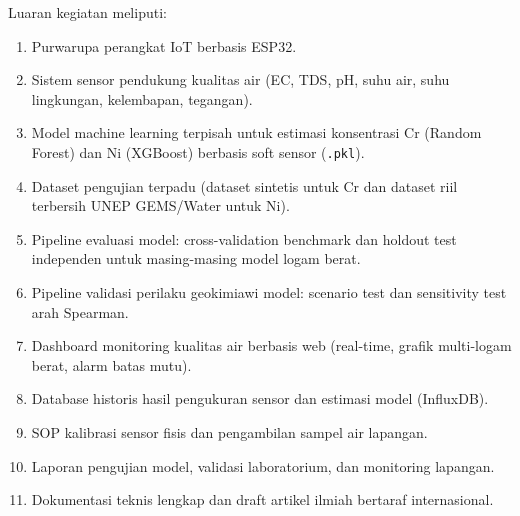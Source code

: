 \documentclass[12pt,a4paper]{article}
\begin{document}
Luaran kegiatan meliputi:

\begin{enumerate}
    \item Purwarupa perangkat IoT berbasis ESP32.
    \item Sistem sensor pendukung kualitas air (EC, TDS, pH, suhu air, suhu lingkungan, kelembapan, tegangan).
    \item Model machine learning terpisah untuk estimasi konsentrasi Cr (Random Forest) dan Ni (XGBoost) berbasis soft sensor (\texttt{.pkl}).
    \item Dataset pengujian terpadu (dataset sintetis untuk Cr dan dataset riil terbersih UNEP GEMS/Water untuk Ni).
    \item Pipeline evaluasi model: cross-validation benchmark dan holdout test independen untuk masing-masing model logam berat.
    \item Pipeline validasi perilaku geokimiawi model: scenario test dan sensitivity test arah Spearman.
    \item Dashboard monitoring kualitas air berbasis web (real-time, grafik multi-logam berat, alarm batas mutu).
    \item Database historis hasil pengukuran sensor dan estimasi model (InfluxDB).
    \item SOP kalibrasi sensor fisis dan pengambilan sampel air lapangan.
    \item Laporan pengujian model, validasi laboratorium, dan monitoring lapangan.
    \item Dokumentasi teknis lengkap dan draft artikel ilmiah bertaraf internasional.
\end{enumerate}
\end{document}
